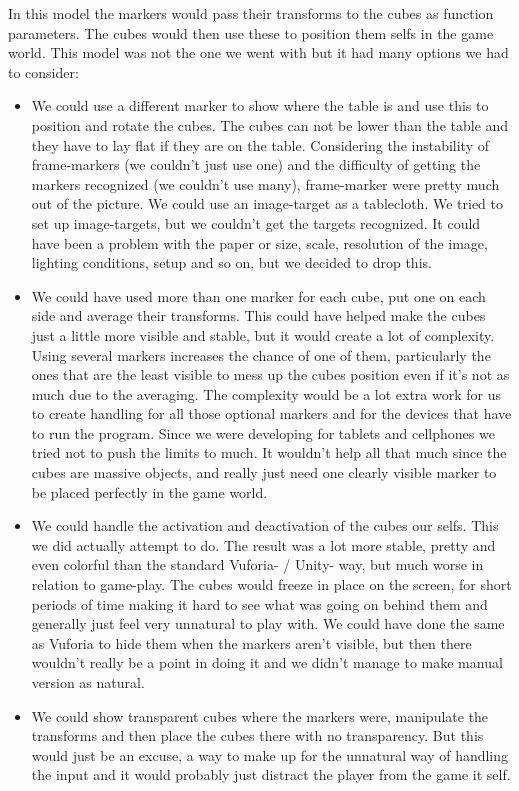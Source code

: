 In this model the markers would pass their transforms to the cubes as function parameters. The cubes would then use these to position them selfs in the game world. This model was not the one we went with but it had many options we had to consider:
\begin{itemize}
  \item We could use a different marker to show where the table is and use this to position and rotate the cubes. The cubes can not be lower than the table and they have to lay flat if they are on the table. Considering the instability of frame-markers (we couldn't just use one) and the difficulty of getting the markers recognized (we couldn't use many), frame-marker were pretty much out of the picture. We could use an image-target as a tablecloth. We tried to set up image-targets, but we couldn't get the targets recognized. It could have been a problem with the paper or size, scale, resolution of the image, lighting conditions, setup and so on, but we decided to drop this.
  \item We could have used more than one marker for each cube, put one on each side and average their transforms. This could have helped make the cubes just a little more visible and stable, but it would create a lot of complexity. Using several markers increases the chance of one of them, particularly the ones that are the least visible to mess up the cubes position even if it's not as much due to the averaging. The complexity would be a lot extra work for us to create handling for all those optional markers and for the devices that have to run the program. Since we were developing for tablets and cellphones we tried not to push the limits to much. It wouldn't help all that much since the cubes are massive objects, and really just need one clearly visible marker to be placed perfectly in the game world.
  \item We could handle the activation and deactivation of the cubes our selfs. This we did actually attempt to do. The result was a lot more stable, pretty and even colorful than the standard Vuforia- / Unity- way, but much worse in relation to game-play. The cubes would freeze in place on the screen, for short periods of time making it hard to see what was going on behind them and generally just feel very unnatural to play with. We could have done the same as Vuforia to hide them when the markers aren't visible, but then there wouldn't really be a point in doing it and we didn't manage to make manual version as natural. 
  \item We could show transparent cubes where the markers were, manipulate the transforms and then place the cubes there with no transparency. But this would just be an excuse, a way to make up for the unnatural way of handling the input and it would probably just distract the player from the game it self.
\end{itemize}
